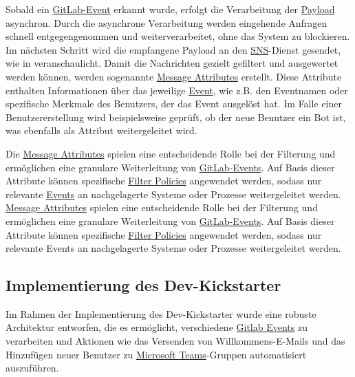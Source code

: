 Sobald ein \hyperlink{GitLabEvent}{\textcolor{AOBlau}{GitLab-Event}} erkannt wurde, erfolgt die Verarbeitung der \hyperlink{Payload}{\textcolor{AOBlau}{Payload}} asynchron. Durch die asynchrone Verarbeitung werden eingehende Anfragen schnell entgegengenommen und weiterverarbeitet, ohne das System zu blockieren. Im nächsten Schritt wird die empfangene Payload an den \hyperlink{SNS}{\textcolor{AOBlau}{SNS}}-Dienst gesendet, wie in  veranschaulicht. Damit die Nachrichten gezielt gefiltert und ausgewertet werden können, werden sogenannte \hyperlink{MessageAttributes}{\textcolor{AOBlau}{Message Attributes}} erstellt. Diese Attribute enthalten Informationen über das jeweilige \hyperlink{GitLabEvent}{\textcolor{AOBlau}{Event}}, wie z.B. den Eventnamen oder spezifische Merkmale des Benutzers, der das Event ausgelöst hat. Im Falle einer Benutzererstellung wird beispielsweise geprüft, ob der neue Benutzer ein Bot ist, was ebenfalls als Attribut weitergeleitet wird.

Die \hyperlink{MessageAttributes}{\textcolor{AOBlau}{Message Attributes}} spielen eine entscheidende Rolle bei der Filterung und ermöglichen eine granulare Weiterleitung von \hyperlink{GitLabEvent}{\textcolor{AOBlau}{GitLab-Events}}. Auf Basis dieser Attribute können spezifische \hyperlink{FilterPolicies}{\textcolor{AOBlau}{Filter Policies}} angewendet werden, sodass nur relevante \hyperlink{Events}{\textcolor{AOBlau}{Events}} an nachgelagerte Systeme oder Prozesse weitergeleitet werden.
\hyperlink{MessageAttributes}{\textcolor{AOBlau}{Message Attributes}} spielen eine entscheidende Rolle bei der Filterung und ermöglichen eine granulare Weiterleitung von \hyperlink{GitLabEvent}{\textcolor{AOBlau}{GitLab-Events}}. Auf Basis dieser Attribute können spezifische \hyperlink{FilterPolicies}{\textcolor{AOBlau}{Filter Policies}} angewendet werden, sodass nur relevante Events an nachgelagerte Systeme oder Prozesse weitergeleitet werden.

\subsection{Implementierung des Dev-Kickstarter}
\label{sec:ImplementierungBenutzeroberflaeche}

Im Rahmen der Implementierung des Dev-Kickstarter wurde eine robuste Architektur entworfen, die es ermöglicht, verschiedene \hyperlink{GitLabEvent}{\textcolor{AOBlau}{Gitlab Events}} zu verarbeiten und Aktionen wie das Versenden von Willkommens-E-Mails und das Hinzufügen neuer Benutzer zu \hyperlink{MicrosoftTeams}{\textcolor{AOBlau}{Microsoft Teams}}-Gruppen automatisiert auszuführen.

